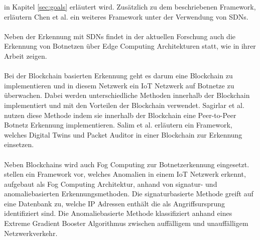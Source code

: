 in Kapitel \ref{sec:goals} erläutert wird. Zusätzlich zu dem beschriebenen Framework, erläutern Chen et al. \cite{Chen2017BotGuardLR} ein weiteres Framework unter der Verwendung von 
SDNs. \\ \\ Neben der Erkennung mit SDNs findet in der aktuellen Forschung auch die Erkennung von Botnetzen über Edge Computing Architekturen statt, wie \cite{gromov2022edge} in ihrer
Arbeit zeigen. \\ \\ Bei der Blockchain basierten Erkennung geht es darum eine Blockchain zu implementieren und in diesem Netzwerk ein IoT Netzwerk auf Botnetze zu überwachen. Dabei 
werden unterschiedliche Methoden innerhalb der Blockchain implementiert und mit den Vorteilen der Blockchain verwendet. Sagirlar et al. \cite{DBLP:journals/corr/abs-1809-10775} nutzen
diese Methode indem sie innerhalb der Blockchain eine Peer-to-Peer Botnetz Erkennung implementieren. Salim et al. \cite{DBLP:journals/sensors/SalimATPP22} erläutern ein Framework, welches 
Digital Twins und Packet Auditor in einer Blockchain zur Erkennung einsetzen. \\ \\ Neben Blockchains wird auch Fog Computing zur Botnetzerkennung eingesetzt. \cite{Lawal2020AnAM} stellen 
ein Framework vor, welches Anomalien in einem IoT Netzwerk erkennt, aufgebaut als Fog Computing Architektur, anhand von signatur- und anomaliebasierten Erkennungsmethoden. Die signaturbasierte 
Methode greift auf eine Datenbank zu, welche IP Adressen enthält die als Angriffsursprung identifiziert sind. Die Anomaliebasierte Methode klassifiziert anhand eines Extreme Gradient Booster Algorithmus 
\cite{DBLP:journals/corr/ChenG16} zwischen auffälligem und unauffälligem Netzwerkverkehr.

